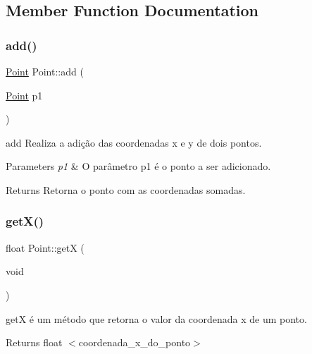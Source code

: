 \subsection{Member Function Documentation}
\mbox{\label{classPoint_a9dbea84b07b0a8ec3bbb9e58b3d15899}} 
\subsubsection{\texorpdfstring{add()}{add()}}
{\footnotesize\ttfamily \hyperlink{classPoint}{Point} Point\+::add (\begin{DoxyParamCaption}\item[{\hyperlink{classPoint}{Point}}]{p1 }\end{DoxyParamCaption})}



add Realiza a adição das coordenadas x e y de dois pontos. 


\begin{DoxyParams}{Parameters}
{\em p1} & O parâmetro p1 é o ponto a ser adicionado. \\
\hline
\end{DoxyParams}
\begin{DoxyReturn}{Returns}
Retorna o ponto com as coordenadas somadas. 
\end{DoxyReturn}
\mbox{\label{classPoint_a9aa94b8fd07296e64d304ef3750db113}} 
\subsubsection{\texorpdfstring{get\+X()}{getX()}}
{\footnotesize\ttfamily float Point\+::getX (\begin{DoxyParamCaption}\item[{void}]{ }\end{DoxyParamCaption})}



getX é um método que retorna o valor da coordenada x de um ponto. 

\begin{DoxyReturn}{Returns}
float $<$coordenada\+\_\+x\+\_\+do\+\_\+ponto$>$ 
\end{DoxyReturn}
\mbox{\label{classPoint_a2444daa96871c89614510bc4bfcd19ce}} 
